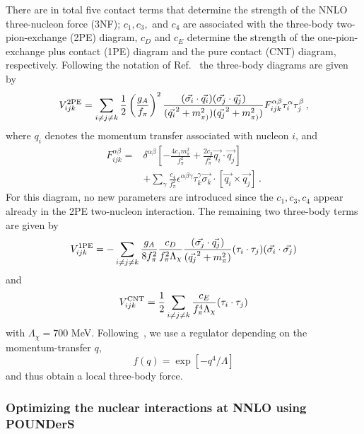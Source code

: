 \documentclass[aps,showpacs,floatfix,nofootinbib,preprintnumbers,superscriptaddress,amsmath,amssymb]{revtex4-1}
\begin{document}
There are in total five contact terms that determine the strength of the NNLO
three-nucleon force (3NF); $c_1,c_3,$ and $c_4$ are associated with
the three-body two-pion-exchange (2PE) diagram, $c_D$ and $c_E$
determine the strength of the one-pion-exchange plus contact (1PE)
diagram and the pure contact (CNT) diagram, respectively. Following
the notation of Ref.~\cite{epelbaum2002} the three-body diagrams are given
by
\begin{equation}
V^{\textnormal{2PE}}_{ijk} = \sum_{i \neq j \neq k} \frac{1}{2} \left( \frac{g_A}{f_{\pi}} \right)^2 \frac{(\vec{\sigma_i} \cdot \vec{q_i})(\vec{\sigma_j}\cdot \vec{q_j})}{(\vec{q_i}^2 + m_{\pi)}^2)(\vec{q_j}^2 + m_{\pi)}^2)} F_{ijk}^{\alpha \beta} \tau_i^{\alpha}\tau_{j}^{\beta} \,,
\end{equation}
where $q_{i}$ denotes the momentum transfer associated with nucleon $i$, and
\begin{align}
F_{ijk}^{\alpha \beta} ={}&  \delta^{\alpha \beta} \left[ -\frac{4c_1m_{\pi}^2}{f_{\pi}^2} + \frac{2c_3}{f_{\pi}^2}\vec{q_i}\cdot \vec{q_j}\right]\\
{}&+\sum_{\gamma}\frac{c_4}{f_{\pi}^2}\epsilon^{\alpha \beta \gamma} \tau_{k}^{\gamma} \vec{\sigma_k} \cdot [\vec{q_i} \times \vec{q_j}] \,.
\end{align}
For this diagram, no new parameters are introduced since the $c_1,c_3,c_4$ appear already in the 2PE two-nucleon interaction. The remaining two three-body terms are given by
\begin{equation}
V^{\textnormal{1PE}}_{ijk} = -\sum_{i \neq j \neq k} \frac{g_A}{8f_{\pi}^2} \frac{c_D}{f_{\pi}^2\Lambda_{\chi}} \frac{ (\vec{\sigma_j} \cdot \vec{q_j})}{(\vec{q_j}^2 + m_{\pi}^2)} (\tau_i \cdot \tau_j)(\vec{\sigma_i}\cdot \vec{\sigma_j})
\end{equation}
and
\begin{equation}
V^{\textnormal{CNT}}_{ijk} = \frac{1}{2}\sum_{i \neq j \neq k} \frac{c_E}{f_{\pi}^4 \Lambda_{\chi}} (\tau_i \cdot \tau_j) 
\end{equation}
with $\Lambda_{\chi}=700$ MeV. Following~\cite{navratil2007}, we use a regulator depending on the momentum-transfer $q$, 
\begin{equation}
f(q) = \exp[-q^4/\Lambda]
\end{equation}
and thus obtain a local three-body force. 




\subsubsection{Optimizing the nuclear interactions at NNLO using POUNDerS}
\end{document}
